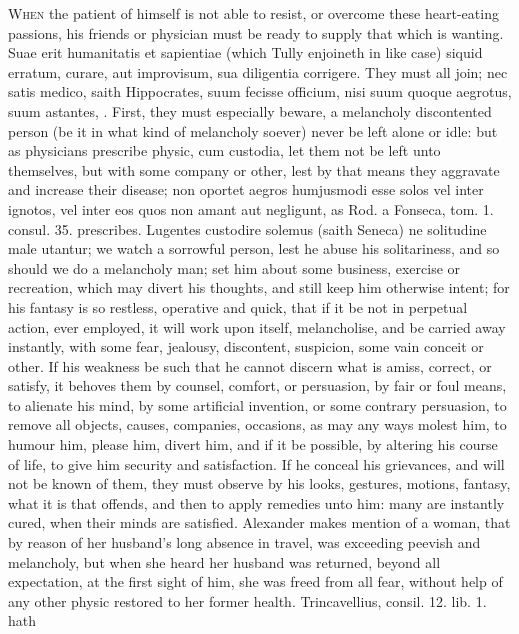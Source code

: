 {\lettrine{W}{hen} the patient of himself is not able to resist, or overcome these
heart-eating passions, his friends or physician must be ready to supply
that which is wanting. Suae erit humanitatis et sapientiae (which
 Tully enjoineth in like case) siquid erratum, curare, aut
improvisum, sua diligentia corrigere. They must all join; nec satis
medico, saith  Hippocrates, suum fecisse officium, nisi suum
quoque aegrotus, suum astantes, \etc{}. First, they must especially beware,
a melancholy discontented person (be it in what kind of melancholy
soever) never be left alone or idle: but as physicians prescribe
physic, cum custodia, let them not be left unto themselves, but with
some company or other, lest by that means they aggravate and increase
their disease; non oportet aegros humjusmodi esse solos vel inter
ignotos, vel inter eos quos non amant aut negligunt, as Rod. a Fonseca,
tom. 1. consul. 35. prescribes. Lugentes custodire solemus (saith
Seneca) ne solitudine male utantur; we watch a sorrowful person,
lest he abuse his solitariness, and so should we do a melancholy man;
set him about some business, exercise or recreation, which may divert
his thoughts, and still keep him otherwise intent; for his fantasy is
so restless, operative and quick, that if it be not in perpetual
action, ever employed, it will work upon itself, melancholise, and be
carried away instantly, with some fear, jealousy, discontent,
suspicion, some vain conceit or other. If his weakness be such that he
cannot discern what is amiss, correct, or satisfy, it behoves them by
counsel, comfort, or persuasion, by fair or foul means, to alienate his
mind, by some artificial invention, or some contrary persuasion, to
remove all objects, causes, companies, occasions, as may any ways
molest him, to humour him, please him, divert him, and if it be
possible, by altering his course of life, to give him security and
satisfaction. If he conceal his grievances, and will not be known of
them, they must observe by his looks, gestures, motions, fantasy,
what it is that offends, and then to apply remedies unto him: many are
instantly cured, when their minds are satisfied. Alexander makes
mention of a woman, that by reason of her husband's long absence in
travel, was exceeding peevish and melancholy, but when she heard her
husband was returned, beyond all expectation, at the first sight of
him, she was freed from all fear, without help of any other physic
restored to her former health. Trincavellius, consil. 12. lib. 1. hath
}
